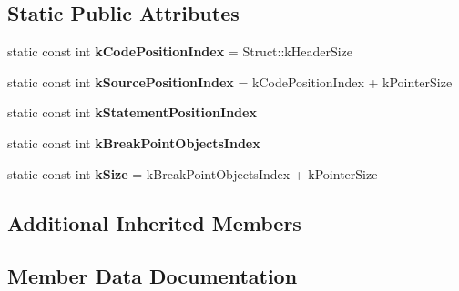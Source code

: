 \subsection*{Static Public Attributes}
\begin{DoxyCompactItemize}
\item 
\hypertarget{classv8_1_1internal_1_1_break_point_info_aab11782a8a2cefb3488f9122fff2df1d}{}static const int {\bfseries k\+Code\+Position\+Index} = Struct\+::k\+Header\+Size\label{classv8_1_1internal_1_1_break_point_info_aab11782a8a2cefb3488f9122fff2df1d}

\item 
\hypertarget{classv8_1_1internal_1_1_break_point_info_a276bc6e4b8c20c6e1e2a9478500fc592}{}static const int {\bfseries k\+Source\+Position\+Index} = k\+Code\+Position\+Index + k\+Pointer\+Size\label{classv8_1_1internal_1_1_break_point_info_a276bc6e4b8c20c6e1e2a9478500fc592}

\item 
static const int {\bfseries k\+Statement\+Position\+Index}
\item 
static const int {\bfseries k\+Break\+Point\+Objects\+Index}
\item 
\hypertarget{classv8_1_1internal_1_1_break_point_info_a50c4c77b2856170fe150ee0e1a1e5d28}{}static const int {\bfseries k\+Size} = k\+Break\+Point\+Objects\+Index + k\+Pointer\+Size\label{classv8_1_1internal_1_1_break_point_info_a50c4c77b2856170fe150ee0e1a1e5d28}

\end{DoxyCompactItemize}
\subsection*{Additional Inherited Members}


\subsection{Member Data Documentation}
\hypertarget{classv8_1_1internal_1_1_break_point_info_ae4ecacd32915b48357a34430c701256f}{}
